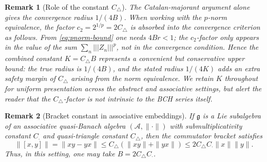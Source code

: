 \documentclass[10pt,a4paper]{amsart}
\newtheorem{remark}{Remark}
\newcommand{\Cbracket}{B}            %
\newcommand{\Cmult}{C_{\cdot}}       %
\newcommand{\Ctotal}{K}              %
\newcommand{\Ctri}{C_{\triangle}}    %
\newcommand{\pnorm}[1]{\left\vert\!\left\vert\!\left\vert #1 \right\vert\!\right\vert\!\right\vert} %
\begin{document}
\begin{remark}[Role of the constant $\Ctri$]\label{rem:role-ctri}
The Catalan-majorant argument alone gives the convergence radius $1/(4\Cbracket)$.  When
working with the $p$-norm equivalence, the factor $c_2 = 2^{1/p} = 2\Ctri$ is absorbed
into the convergence criterion as follows.  From \eqref{eq:pnorm-bound} one needs
$4\Cbracket r < 1$; the $c_2$-factor only appears in the \emph{value} of the sum
$\sum_n\pnorm{Z_n}^p$, not in the convergence condition.  Hence the combined constant
$\Ctotal = \Ctri\Cbracket$ represents a convenient but conservative upper bound: the true
radius is $1/(4\Cbracket)$, and the stated radius $1/(4\Ctotal)$ adds an extra safety
margin of $\Ctri$ arising from the norm equivalence.  We retain $\Ctotal$ throughout for
uniform presentation across the abstract and associative settings, but alert the reader
that the $\Ctri$-factor is not intrinsic to the BCH series itself.
\end{remark}

\begin{remark}[Bracket constant in associative embeddings]\label{rem:bracket-associative}
If $\mathfrak{g}$ is a Lie subalgebra of an associative quasi-Banach algebra
$(\mathcal{A},\|\cdot\|)$ with submultiplicativity constant $\Cmult$ and quasi-triangle
constant $\Ctri$, then the commutator bracket satisfies
\[
  \|[x,y]\| = \|xy - yx\| \le \Ctri(\|xy\| + \|yx\|) \le 2\Ctri\Cmult\|x\|\|y\|.
\]
Thus, in this setting, one may take $\Cbracket = 2\Ctri\Cmult$.
\end{remark}
\end{document}
